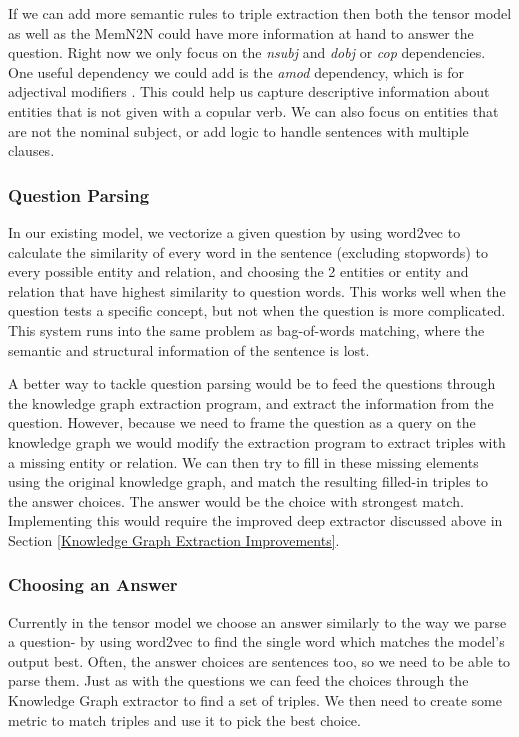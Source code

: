 \documentclass[pageno]{jpaper}
\begin{document}
If we can add more semantic rules to triple extraction then both the tensor
model as well as the MemN2N could have more information at hand to answer the
question. Right now we only focus on the \textit{nsubj} and \textit{dobj} or
\textit{cop} dependencies. One useful dependency we could add is the
\textit{amod} dependency, which is for adjectival modifiers \cite{De2014}. This
could help us capture descriptive information about entities that is not given
with a copular verb. We can also focus on entities that are not the nominal
subject, or add logic to handle sentences with multiple clauses.

\subsubsection{Question Parsing}
\label{Question Parsing}

In our existing model, we vectorize a given question by using word2vec to
calculate the similarity of every word in the sentence (excluding stopwords) to
every possible entity and relation, and choosing the 2 entities or entity and
relation that have highest similarity to question words. This works well when
the question tests a specific concept, but not when the question is more
complicated. This system runs into the same problem as bag-of-words matching,
where the semantic and structural information of the sentence is lost.

A better way to tackle question parsing would be to feed the questions through
the knowledge graph extraction program, and extract the information from the
question. However, because we need to frame the question as a query on the
knowledge graph we would modify the extraction program to extract triples with a
missing entity or relation. We can then try to fill in these missing elements
using the original knowledge graph, and match the resulting filled-in triples to
the answer choices. The answer would be the choice with strongest match.
Implementing this would require the improved deep extractor discussed above in
Section \ref{Knowledge Graph Extraction Improvements}.

\subsubsection{Choosing an Answer}
\label{Choosing an Answer}

Currently in the tensor model we choose an answer similarly to the way we parse
a question- by using word2vec to find the single word which matches the model's
output best. Often, the answer choices are sentences too, so we need to be able
to parse them. Just as with the questions we can feed the choices through the
Knowledge Graph extractor to find a set of triples. We then need to create some
metric to match triples and use it to pick the best choice.
\end{document}
